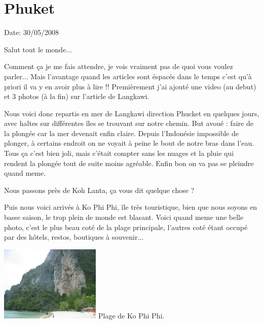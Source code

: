 \section{Phuket}

Date: 30/05/2008

\begin{multicols}{2}

Salut tout le monde...

Comment ça je me fais attendre, je vois vraiment pas de quoi vous voulez parler... Mais l'avantage quand les articles sont éspacés dans le temps c'est qu'à priori il va y en avoir plus à lire !! Premièrement j'ai ajouté une video (au debut) et 3 photos (à la fin) sur l'article de Langkawi.

Nous voici donc repartis en mer de Langkawi direction Phucket en quelques jours, avec haltes sur différentes îles se trouvant sur notre chemin. But avoué : faire de la plongée car la mer devenait enfin claire. Depuis l'Indonésie impossible de plonger, à certains endroit on ne voyait à peine le bout de notre bras dans l'eau. Tous ça c'est bien joli, mais c'était compter sans les nuages et la pluie qui rendent la plongée tout de suite moins agréable. Enfin bon on va pas se pleindre quand meme.

Nous passons près de Koh Lanta, ça vous dit quelque chose ?


Puis nous voici arrivés à Ko Phi Phi, île très touristique, bien que nous soyons en basse saison, le trop plein de monde est blasant. Voici quand meme une belle photo, c'est le plus beau coté de la plage principale, l'autres coté étant occupé par des hôtels, restos, boutiques à souvenir...

\hspace*{-0.65cm}
\includegraphics[width=4.8cm]{articles/Phucket/12121623747QwQ.jpg}
Plage de Ko Phi Phi.


\end{multicols}
